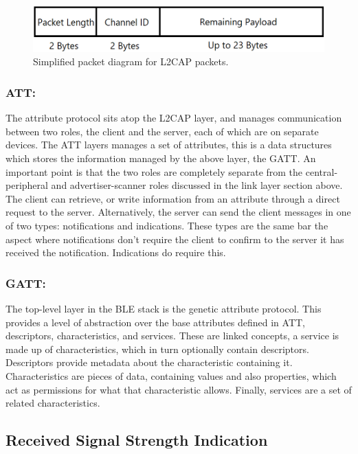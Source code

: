\documentclass{l4proj}
\begin{document}
\begin{figure}[!htb]
    \centering
    \includegraphics[width=0.8\linewidth]{images/l2cap.png}

    \caption{ Simplified packet diagram for L2CAP packets. }

    \label{fig:l2cap}
\end{figure}

\subsubsection{ATT:} The attribute protocol sits atop the L2CAP layer, and manages communication between two roles, the client and the server, each of which are on separate devices. The ATT layers manages a set of attributes, this is a data structures which stores the information managed by the above layer, the GATT. An important point is that the two roles are completely separate from the central-peripheral and advertiser-scanner roles \citep{gomez_overview_2012} discussed in the link layer section above. The client can retrieve, or write information from an attribute through a direct request to the server. Alternatively, the server can send the client messages in one of two types: notifications and indications. These types are the same bar the aspect where notifications don't require the client to confirm to the server it has received the notification. Indications do require this.

\subsubsection{GATT:} The top-level layer in the BLE stack is the genetic attribute protocol. This provides a level of abstraction over the base attributes defined in ATT, descriptors, characteristics, and services. These are linked concepts, a service is made up of characteristics, which in turn optionally contain descriptors. Descriptors provide metadata about the characteristic containing it. Characteristics are pieces of data, containing values and also properties, which act as permissions for what that characteristic allows. Finally, services are a set of related characteristics.

\subsection{Received Signal Strength Indication} \label{sec:rssi}
\end{document}
